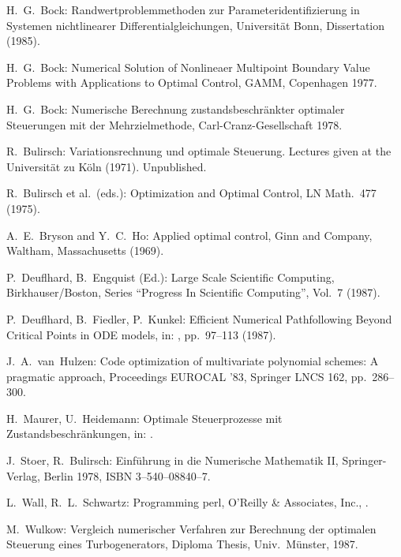 \documentclass[12pt,a4paper]{article}
\newcommand{\perl}{{\sf perl}}
\begin{document}
\begin{thebibliography}{99}

   H.~G.~Bock:
  \newblock Randwertproblemmethoden zur Parameteridentifizierung
            in Systemen nichtlinearer Differentialgleichungen,
  \newblock Universit\"at Bonn, Dissertation (1985).

   H.~G.~Bock:
  \newblock Numerical Solution of Nonlineaer Multipoint Boundary Value
            Problems with Applications to Optimal Control,
  \newblock GAMM, Copenhagen 1977.

   H.~G.~Bock:
  \newblock Numerische Berechnung zustandsbeschr\"ankter optimaler
            Steuerungen mit der Mehrzielmethode,
  \newblock Carl-Cranz-Gesellschaft 1978.

   R.~Bulirsch:
  \newblock Variationsrechnung und optimale Steuerung.
  \newblock Lectures given at the Universit\"at zu K\"oln (1971).
  \newblock Unpublished.

   R.~Bulirsch et al.~(eds.):
  \newblock Optimization and Optimal Control,
  \newblock LN Math.~477 (1975).

   A.~E.~Bryson and Y.~C.~Ho:
  \newblock Applied optimal control,
  \newblock Ginn and Company,
  \newblock Waltham, Massachusetts (1969).

   P.~Deuflhard, B.~Engquist (Ed.):
  \newblock Large Scale Scientific Computing,
  \newblock Birkhauser/Boston, Series ``Progress In Scientific Computing'',
  \newblock Vol.~7 (1987).

   P.~Deuflhard, B.~Fiedler, P.~Kunkel:
  \newblock Efficient Numerical Pathfollowing Beyond Critical Points
            in ODE models,
  \newblock in: \cite{mulcon}, pp.~97--113 (1987).

   J.~A.~van~Hulzen:
  \newblock Code optimization of multivariate polynomial schemes:
            A pragmatic approach,
  \newblock Proceedings EUROCAL '83,
  \newblock Springer LNCS 162, pp.~286--300.

   H.~Maurer, U.~Heidemann:
  \newblock Optimale Steuerprozesse mit Zustandsbeschr\"ankungen,
  \newblock in: \cite{th1}.

   J.~Stoer, R.~Bulirsch: 
  \newblock Einf\"uhrung in die Numerische Mathematik II,
  \newblock Springer-Verlag,
  \newblock Berlin 1978,
  \newblock ISBN 3--540--08840--7.

   L.~Wall, R.~L.~Schwartz:
  \newblock Programming \perl,
  \newblock O'Reilly \& Associates, Inc.,
  .

   M.~Wulkow:
  \newblock Vergleich numerischer Verfahren zur Berechnung der
  optimalen Steuerung eines Turbogenerators,
  \newblock Diploma Thesis, Univ.\ M\"unster, 1987.


\end{thebibliography}
\end{document}
